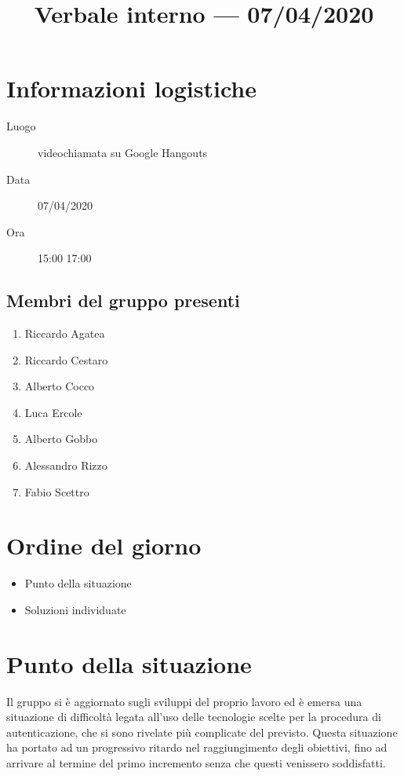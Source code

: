 \documentclass{article}
\title{Verbale interno --- 07/04/2020}
\begin{document}


\section{Informazioni logistiche}%
\label{sec:informazioni_logistiche}

\begin{description}
  \item [Luogo] videochiamata su Google Hangouts
  \item [Data] 07/04/2020
  \item [Ora] 15:00  17:00
\end{description}

\subsection{Membri del gruppo presenti}%
\label{sub:membri_del_gruppo_presenti}

\begin{enumerate}
  \item Riccardo Agatea
  \item Riccardo Cestaro
  \item Alberto Cocco
  \item Luca Ercole
  \item Alberto Gobbo
  \item Alessandro Rizzo
  \item Fabio Scettro
\end{enumerate}

\section{Ordine del giorno}%
\label{sec:ordine_del_giorno}

\begin{itemize}
  \item Punto della situazione
  \item Soluzioni individuate
\end{itemize}

\section{Punto della situazione}%
\label{sec:punto_della_situazione}
Il gruppo si è aggiornato sugli sviluppi del proprio lavoro ed è emersa una situazione di difficoltà legata all'uso delle tecnologie scelte per la procedura di autenticazione, che si sono rivelate più complicate del previsto. Questa situazione ha portato ad un progressivo ritardo nel raggiungimento degli obiettivi, fino ad arrivare al termine del primo incremento senza che questi venissero soddisfatti.
\end{document}
